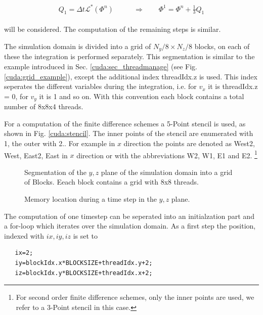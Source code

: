 \begin{align}
    \begin{split}
    Q_1 = \Delta t \mathcal{L}^*\left(\Phi^n\right)\qquad &\Rightarrow \qquad \Phi^{1} = \Phi^n + \frac{1}{3}Q_1
    \end{split}
\end{align}

will be considered.  The computation of the remaining steps is similar.


The simulation domain is divided into a grid of  $N_y/8 \times N_z/8$ blocks, on each of these the integration is performed separately.
This segmentation is similar to the example introduced in Sec. \ref{cuda:sec_threadmanage} (see Fig. \ref{cuda:grid_example}), except the
additional index threadIdx.z is used.
This index seperates the different variables during the integration, i.e. for $v_x$ it is threadIdx.z = 0, for $v_y$  it is 1 and so on.
With this convention each block contains a total number of 8x8x4 threads.

For a computation of the finite difference schemes  a 5-Point stencil is used, as shown in Fig. \ref{cuda:stencil}.
The inner points of the stencil are enumerated with 1, the outer with 2.. For example in $x$ direction the points are denoted as West2,
West, East2, East in $x$ direction or with the abbreviations W2, W1, E1 and E2.
\footnote{For second order finite difference schemes, only the inner points are used, we refer to a 3-Point stencil in this case.}

\begin{figure}[!bp]
      \centering
       \caption{Segmentation of the $y, z$ plane of the simulation domain into a grid of Blocks.
                 Eeach block contains a grid with 8x8 threads.}
       \label{cuda:stencil}
      \centering
       \caption{
           Memory location during a time step in the $y, z$ plane.
           }
       \label{cuda:timestep_algo_img}
\end{figure}

The computation of one timestep can be seperated into an initialzation part and a for-loop which iterates over the simulation domain.
As a first step the position, indexed with $ix, iy, iz$ is set to

\begin{verbatim}
   ix=2;
   iy=blockIdx.x*BLOCKSIZE+threadIdx.y+2;
   iz=blockIdx.y*BLOCKSIZE+threadIdx.x+2;
\end{verbatim}

